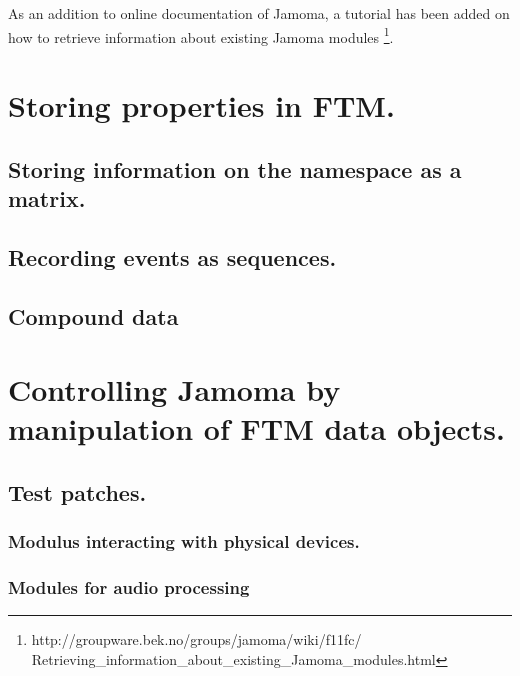 \documentclass{article}
\begin{document}
As an addition to online documentation of Jamoma, a tutorial has been added on how to retrieve information about existing Jamoma modules \footnote{http://groupware.bek.no/groups/jamoma/wiki/f11fc/ \\ Retrieving\_information\_about\_existing\_Jamoma\_modules.html}.


%

\section{Storing properties in FTM.}

\subsection{Storing information on the namespace as a matrix.}

\subsection{Recording events as sequences.}

\subsection{Compound data}


%

\section{Controlling Jamoma by manipulation of FTM data objects.}

\subsection{Test patches.}

\subsubsection{Modulus interacting with physical devices.}


\subsubsection{Modules for audio processing}
\end{document}
